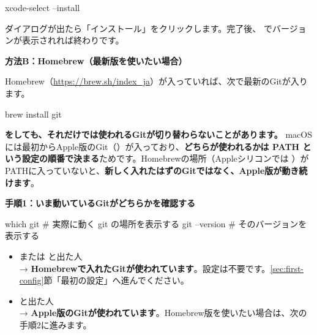 \begin{codebox}[bash]
\begin{code}
xcode-select --install
\end{code}
\end{codebox}

ダイアログが出たら「インストール」をクリックします。完了後、 でバージョンが表示されれば終わりです。

\noindent\textbf{方法B：Homebrew（最新版を使いたい場合）}

Homebrew（\url{https://brew.sh/index_ja}）が入っていれば、次で最新のGitが入ります。

\begin{codebox}[bash]
\begin{code}
brew install git
\end{code}
\end{codebox}

\begin{warnbox}
\textbf{ をしても、それだけでは使われるGitが切り替わらないことがあります。} macOSには最初からApple版のGit（）が入っており、\textbf{どちらが使われるかは PATH という設定の順番で決まる}ためです。Homebrewの場所（Appleシリコンでは ）がPATHに入っていないと、\textbf{新しく入れたはずのGitではなく、Apple版が動き続けます}。
\end{warnbox}

\noindent\textbf{手順1：いま動いているGitがどちらかを確認する}

\begin{codebox}[bash]
\begin{code}
which git      # 実際に動く git の場所を表示する
git --version  # そのバージョンを表示する
\end{code}
\end{codebox}

\begin{itemize}[leftmargin=1.4em]
  \item {} または  と出た人\\
        → \textbf{Homebrewで入れたGitが使われています}。設定は不要です。\ref{sec:first-config}節「最初の設定」へ進んでください。
  \item {} と出た人\\
        → \textbf{Apple版のGitが使われています}。Homebrew版を使いたい場合は、次の手順2に進みます。
\end{itemize}


